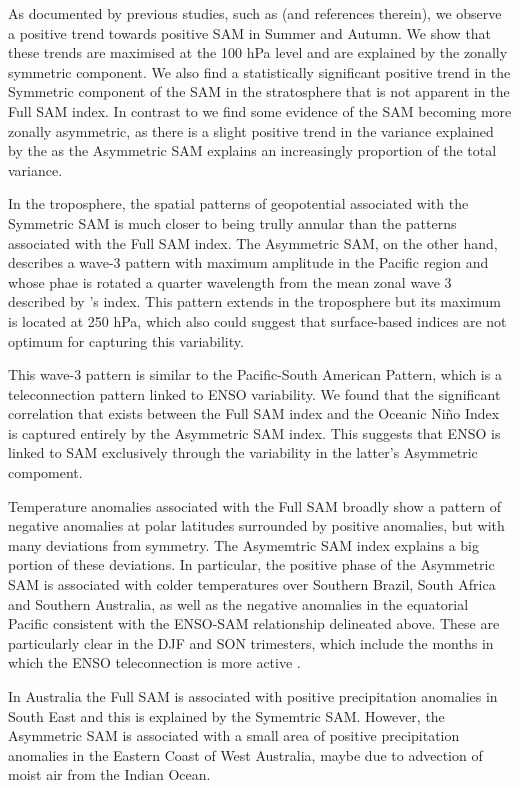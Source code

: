 \documentclass[]{ametsocV5}
\begin{document}
As documented by previous studies, such as \citet{fogt2020} (and
references therein), we observe a positive trend towards positive SAM in
Summer and Autumn. We show that these trends are maximised at the 100
hPa level and are explained by the zonally symmetric component. We also
find a statistically significant positive trend in the Symmetric
component of the SAM in the stratosphere that is not apparent in the
Full SAM index. In contrast to \citet{fogt2012} we find some evidence of
the SAM becoming more zonally asymmetric, as there is a slight positive
trend in the variance explained by the as the Asymmetric SAM explains an
increasingly proportion of the total variance.

In the troposphere, the spatial patterns of geopotential associated with
the Symmetric SAM is much closer to being trully annular than the
patterns associated with the Full SAM index. The Asymmetric SAM, on the
other hand, describes a wave-3 pattern with maximum amplitude in the
Pacific region and whose phae is rotated a quarter wavelength from the
mean zonal wave 3 described by \citet{raphael2004}'s index. This pattern
extends in the troposphere but its maximum is located at 250 hPa, which
also could suggest that surface-based indices are not optimum for
capturing this variability.

This wave-3 pattern is similar to the Pacific-South American Pattern,
which is a teleconnection pattern linked to ENSO variability. We found
that the significant correlation that exists between the Full SAM index
and the Oceanic Niño Index is captured entirely by the Asymmetric SAM
index. This suggests that ENSO is linked to SAM exclusively through the
variability in the latter's Asymmetric compoment.

Temperature anomalies associated with the Full SAM broadly show a
pattern of negative anomalies at polar latitudes surrounded by positive
anomalies, but with many deviations from symmetry. The Asymemtric SAM
index explains a big portion of these deviations. In particular, the
positive phase of the Asymmetric SAM is associated with colder
temperatures over Southern Brazil, South Africa and Southern Australia,
as well as the negative anomalies in the equatorial Pacific consistent
with the ENSO-SAM relationship delineated above. These are particularly
clear in the DJF and SON trimesters, which include the months in which
the ENSO teleconnection is more active
\citep{cazes-boezio2003, fogt2011, cai2020a}.

In Australia the Full SAM is associated with positive precipitation
anomalies in South East and this is explained by the Symemtric SAM.
However, the Asymmetric SAM is associated with a small area of positive
precipitation anomalies in the Eastern Coast of West Australia, maybe
due to advection of moist air from the Indian Ocean.
\end{document}
